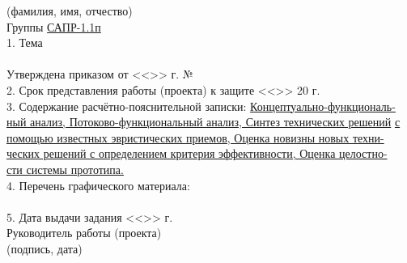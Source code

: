 \begin{titlepage}
    \vspace{-0.2cm}\hspace{5cm}\footnotesize(фамилия, имя, отчество)\normalsize\\
    Группы \underline{\hspace{1cm}САПР-1.1п\hspace{2cm}}\\
    1. Тема \underline{\hspace{15.3cm}}\\
    \underline{\hspace{\textwidth}}\\
    Утверждена приказом от <<\underline{\hspace{1cm}}>> \underline{\hspace{4cm}} 
        \the\year г. № \underline{\hspace{3.8cm}}\\
    2. Срок представления работы (проекта) к защите 
        <<\underline{\hspace{1cm}}>> \underline{\hspace{2.8cm}} 20\underline{\hspace{0.5cm}} г.\\
    3. Содержание расчётно-пояснительной записки: \underline{Концептуально-функциональ-} 
    \underline{ный анализ, Потоково-функциональный анализ, Синтез технических решений} 
    \underline{с помощью известных эвристических приемов, Оценка новизны новых техни-} 
    \underline{ческих решений с определением критерия эффективности, Оценка целостно-}\\
    \underline{сти системы прототипа.}\\
    4. Перечень графического материала: \underline{\hspace{8.5cm}}\\
    \underline{\hspace{\textwidth}}\\
    5. Дата выдачи задания <<\underline{\hspace{1cm}}>> \underline{\hspace{4cm}} \the\year г.\\
    Руководитель работы (проекта) \underline{\hspace{5cm}}
        \hspace{0.5cm} \underline{\hspace{4.2cm}}\\
        \vspace{-0.2cm}\hspace{8cm}\footnotesize(подпись, дата)

\end{titlepage}
